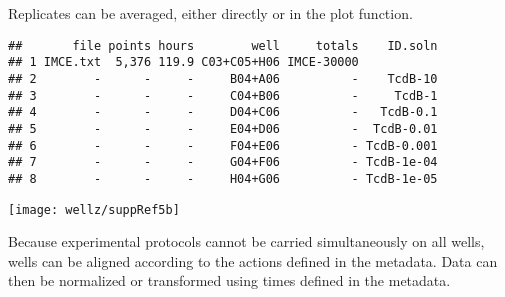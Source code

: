 Replicates can be averaged, either directly or in the plot function.

\begin{knitrout}
\color{fgcolor}\begin{kframe}
\begin{alltt}
 \hlkwb{=} 
\end{alltt}
\begin{verbatim}
##       file points hours        well     totals    ID.soln
## 1 IMCE.txt  5,376 119.9 C03+C05+H06 IMCE-30000           
## 2        -      -     -     B04+A06          -    TcdB-10
## 3        -      -     -     C04+B06          -     TcdB-1
## 4        -      -     -     D04+C06          -   TcdB-0.1
## 5        -      -     -     E04+D06          -  TcdB-0.01
## 6        -      -     -     F04+E06          - TcdB-0.001
## 7        -      -     -     G04+F06          - TcdB-1e-04
## 8        -      -     -     H04+G06          - TcdB-1e-05
\end{verbatim}
\begin{alltt}
 \hlkwb{=} 
    \hlstd{(}\hlstd{,} \hlstd{),}
     \hlstd{=} \hlstd{)}
  \hlstd{=} \hlstd{,}
     \hlstd{=} \hlstd{(}\hlopt{-}\hlstd{,} \hlstd{))}
\end{alltt}
\end{kframe}
\texttt{[image: wellz/suppRef5b]} 
\end{knitrout}

Because experimental protocols cannot be carried
simultaneously on all wells, 
wells can be aligned according to the actions defined in the metadata.
Data can then be normalized or transformed using times defined
in the metadata.

